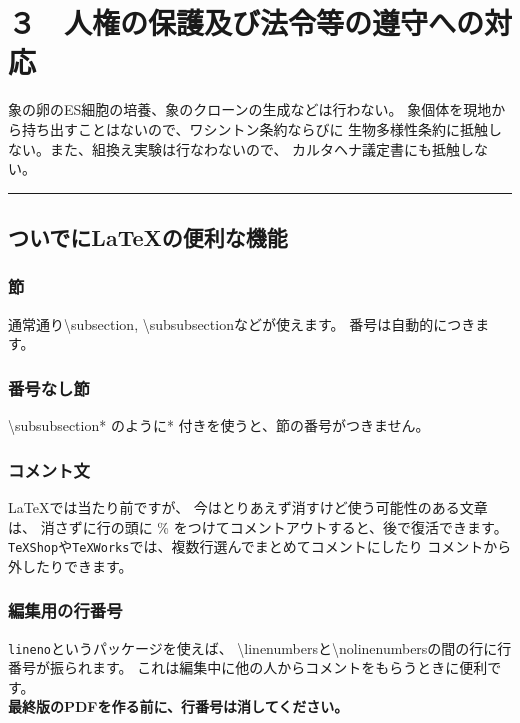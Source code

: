 \documentclass[11pt,a4paper,uplatex,dvipdfmx]{ujarticle} 		%
\newcommand{\研究課題名}{象の卵}
\newcommand{\研究機関名}{逢坂大学}
\newcommand{\研究代表者氏名}{湯川秀樹}
\newcommand{\研究期間の最終元号年度}{12}  %
\begin{document}



\section{３　人権の保護及び法令等の遵守への対応}

	象の卵のES細胞の培養、象のクローンの生成などは行わない。
	象個体を現地から持ち出すことはないので、ワシントン条約ならびに
        生物多様性条約に抵触しない。また、組換え実験は行なわないので、
        カルタヘナ議定書にも抵触しない。

        \noindent
        \rule{\linewidth}{1pt}
        \linenumbers
        \subsection{ついでに\LaTeX の便利な機能}
        \subsubsection{節}
        通常通り\textbackslash subsection, \textbackslash subsubsectionなどが使えます。
        番号は自動的につきます。
        
        \subsubsection*{番号なし節}
        \textbackslash subsubsection* のように* 付きを使うと、節の番号がつきません。
        
        \subsubsection{コメント文}
        \LaTeX では当たり前ですが、
        今はとりあえず消すけど使う可能性のある文章は、
        消さずに行の頭に \% をつけてコメントアウトすると、後で復活できます。
        \texttt{TeXShop}や\texttt{TeXWorks}では、複数行選んでまとめてコメントにしたり
        コメントから外したりできます。
        
        \subsubsection{編集用の行番号}
        \texttt{lineno}というパッケージを使えば、
        \textbackslash linenumbersと\textbackslash nolinenumbersの間の行に行番号が振られます。
        これは編集中に他の人からコメントをもらうときに便利です。\\
        \textbf{最終版のPDFを作る前に、行番号は消してください。}
        
\end{document}
